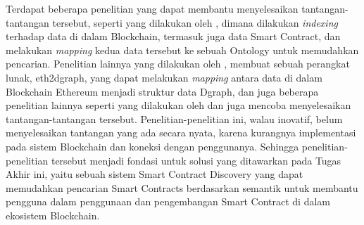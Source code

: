 Terdapat beberapa penelitian yang dapat membantu menyelesaikan tantangan-tantangan tersebut, seperti yang dilakukan oleh \cite{third2017linked}, dimana dilakukan \textit{indexing} terhadap data di dalam Blockchain, termasuk juga data Smart Contract, dan melakukan \textit{mapping} kedua data tersebut ke sebuah Ontology untuk memudahkan pencarian. Penelitian lainnya yang dilakukan oleh \cite{aimar2023extraction}, membuat sebuah perangkat lunak, eth2dgraph, yang dapat melakukan \textit{mapping} antara data di dalam Blockchain Ethereum menjadi struktur data Dgraph, dan juga beberapa penelitian lainnya seperti yang dilakukan oleh \cite{baqa2019semantic} dan \cite{cano2021toward} juga mencoba menyelesaikan tantangan-tantangan tersebut. Penelitian-penelitian ini, walau inovatif, belum menyelesaikan tantangan yang ada secara nyata, karena kurangnya implementasi pada sistem Blockchain dan koneksi dengan penggunanya. Sehingga penelitian-penelitian tersebut menjadi fondasi untuk solusi yang ditawarkan pada Tugas Akhir ini, yaitu sebuah sistem Smart Contract Discovery yang dapat memudahkan pencarian Smart Contracts berdasarkan semantik untuk membantu pengguna dalam penggunaan dan pengembangan Smart Contract di dalam ekosistem Blockchain.





